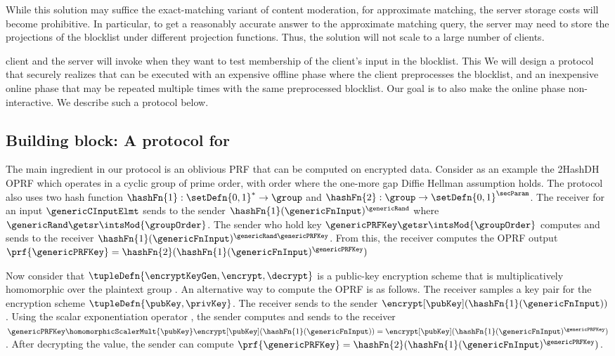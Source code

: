 While this solution may suffice the exact-matching variant of content moderation, for approximate matching, the server storage costs will become prohibitive. In particular, to get a reasonably accurate answer to the approximate matching query, the server may need to store the projections of the blocklist under different projection functions. Thus, the solution will not scale to a large number of clients. 


client and the server will invoke \arpmtFunc when they want to test membership of the client's input \genericCInputElmt in the blocklist. This  We will design a protocol that securely realizes \arpmtFunc that can be executed with an expensive offline phase where the client preprocesses the blocklist, and an inexpensive online phase that may be repeated multiple times with the same preprocessed blocklist. Our goal is to also make the online phase non-interactive. We describe such a protocol below. 

\subsection{Building block: A protocol for \arpmtFunc}
%
The main ingredient in our protocol is an oblivious PRF that can be computed on encrypted data. Consider as an example the 2HashDH OPRF which operates in a cyclic group of prime order, \group with order \groupOrder where the one-more gap Diffie Hellman assumption holds. The protocol also uses two hash function 
$\hashFn{1}: \setDefn{0,1}^{\ast} \rightarrow \group$ and $\hashFn{2}: \group \rightarrow \setDefn{0,1}^{\secParam}$. The receiver for an input $\genericCInputElmt$ sends to the sender $\hashFn{1}(\genericFnInput)^{\genericRand}$ where $\genericRand \getsr \intsMod{\groupOrder}$. The sender who hold key $\genericPRFKey \getsr \intsMod{\groupOrder}$ computes and sends to the receiver $\hashFn{1}(\genericFnInput)^{\genericRand \genericPRFKey}$. From this, the receiver computes the OPRF output $\prf{\genericPRFKey} = \hashFn{2}(\hashFn{1}(\genericFnInput)^{\genericPRFKey})$

Now consider that $\tupleDefn{\encryptKeyGen, \encrypt, \decrypt}$ is a public-key encryption scheme that is multiplicatively homomorphic over the 
plaintext group \group. An alternative way to compute the OPRF is as follows. The receiver samples a key pair for the encryption scheme $\tupleDefn{\pubKey, \privKey}$. The receiver sends to the sender $\encrypt[\pubKey](\hashFn{1}(\genericFnInput))$. Using the scalar exponentiation operator \homomorphicScalerMult{\pubKey}, the sender computes and sends to the receiver $\genericPRFKey \homomorphicScalerMult{\pubKey} \encrypt[\pubKey](\hashFn{1}(\genericFnInput)) = \encrypt[\pubKey](\hashFn{1}(\genericFnInput)^{\genericPRFKey})$. After decrypting the value, the sender can compute 
$\prf{\genericPRFKey} = \hashFn{2}(\hashFn{1}(\genericFnInput)^{\genericPRFKey})$. 

